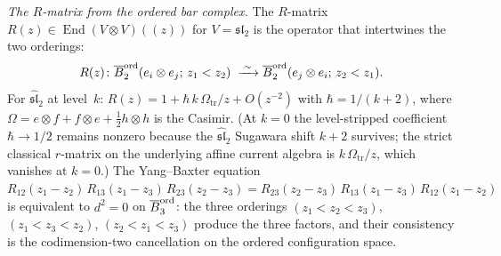 \begin{computation}
\emph{The $R$-matrix from the ordered bar complex.}
The $R$-matrix $R(z)\in\operatorname{End}(V\otimes V)(\!(z)\!)$
for $V=\mathfrak{sl}_2$ is the operator that intertwines
the two orderings:
\[
R(z)\colon
\overline{B}^{\mathrm{ord}}_2(e_i\otimes e_j;\,z_1<z_2)
\;\xrightarrow{\;\sim\;}
\overline{B}^{\mathrm{ord}}_2(e_j\otimes e_i;\,z_2<z_1).
\]
For $\widehat{\mathfrak{sl}}_2$ at level~$k$:
$R(z)=1+\hbar\,k\,\Omega_{\mathrm{tr}}/z+O(z^{-2})$ with
$\hbar=1/(k+2)$, where
$\Omega=e\otimes f+f\otimes e+\tfrac12 h\otimes h$
is the Casimir. (At $k=0$ the level-stripped
coefficient $\hbar\to 1/2$ remains nonzero because
the $\widehat{\mathfrak{sl}}_2$ Sugawara shift
$k+2$ survives; the strict classical $r$-matrix
on the underlying affine current algebra is
$k\,\Omega_{\mathrm{tr}}/z$, which vanishes at $k=0$.) The Yang--Baxter equation
$R_{12}(z_1{-}z_2)\,R_{13}(z_1{-}z_3)\,
R_{23}(z_2{-}z_3)
=R_{23}(z_2{-}z_3)\,R_{13}(z_1{-}z_3)\,
R_{12}(z_1{-}z_2)$
is equivalent to $d^2=0$ on
$\overline{B}^{\mathrm{ord}}_3$: the three orderings
$(z_1<z_2<z_3)$, $(z_1<z_3<z_2)$, $(z_2<z_1<z_3)$
produce the three factors, and their consistency is
the codimension-two cancellation on the ordered
configuration space.
\end{computation}

